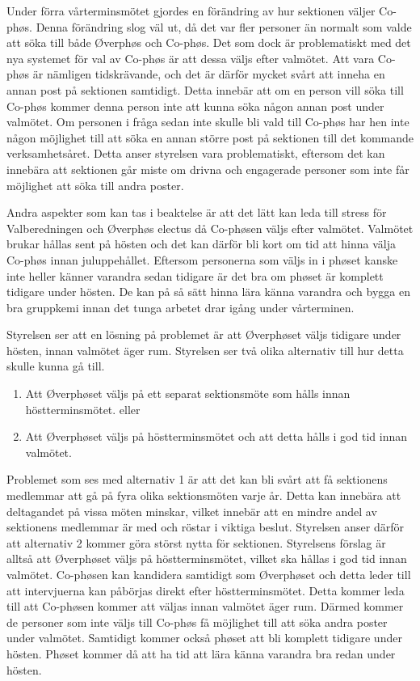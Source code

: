 \documentclass[../_main/handlingar.tex]{subfiles}
\begin{document}

Under förra vårterminsmötet gjordes en förändring av hur sektionen väljer Co-phøs. Denna förändring slog väl ut, då det var fler personer än normalt som valde att söka till både Øverphøs och Co-phøs. Det som dock är problematiskt med det nya systemet för val av Co-phøs är att dessa väljs efter valmötet. Att vara Co-phøs är nämligen tidskrävande, och det är därför mycket svårt att inneha en annan post på sektionen samtidigt. Detta innebär att om en person vill söka till Co-phøs kommer denna person inte att kunna söka någon annan post under valmötet. Om personen i fråga sedan inte skulle bli vald till Co-phøs har hen inte någon möjlighet till att söka en annan större post på sektionen till det kommande verksamhetsåret. Detta anser styrelsen vara problematiskt, eftersom det kan innebära att sektionen går miste om drivna och engagerade personer som inte får möjlighet att söka till andra poster. 

Andra aspekter som kan tas i beaktelse är att det lätt kan leda till stress för Valberedningen och Øverphøs electus då Co-phøsen väljs efter valmötet. Valmötet brukar hållas sent på hösten och det kan därför bli kort om tid att hinna välja Co-phøs innan juluppehållet. Eftersom personerna som väljs in i phøset kanske inte heller känner varandra sedan tidigare är det bra om phøset är komplett tidigare under hösten. De kan på så sätt hinna lära känna varandra och bygga en bra gruppkemi innan det tunga arbetet drar igång under vårterminen. 

Styrelsen ser att en lösning på problemet är att Øverphøset väljs tidigare under hösten, innan valmötet äger rum. Styrelsen ser två olika alternativ till hur detta skulle kunna gå till.
\begin{enumerate}
\item Att Øverphøset väljs på ett separat sektionsmöte som hålls innan höstterminsmötet.
eller
\item Att Øverphøset väljs på höstterminsmötet och att detta hålls i god tid innan valmötet.
\end{enumerate}

Problemet som ses med alternativ 1 är att det kan bli svårt att få sektionens medlemmar att gå på fyra olika sektionsmöten varje år. Detta kan innebära att deltagandet på vissa möten minskar, vilket innebär att en mindre andel av sektionens medlemmar är med och röstar i viktiga beslut. Styrelsen anser därför att alternativ 2 kommer göra störst nytta för sektionen. 
\newpage
Styrelsens förslag är alltså att Øverphøset väljs på höstterminsmötet, vilket ska hållas i god tid innan valmötet. Co-phøsen kan kandidera samtidigt som Øverphøset och detta leder till att intervjuerna kan påbörjas direkt efter höstterminsmötet. Detta kommer leda till att Co-phøsen kommer att väljas innan valmötet äger rum. Därmed kommer de personer som inte väljs till Co-phøs få möjlighet till att söka andra poster under valmötet. Samtidigt kommer också phøset att bli komplett tidigare under hösten. Phøset kommer då att ha tid att lära känna varandra bra redan under hösten. 
\end{document}
